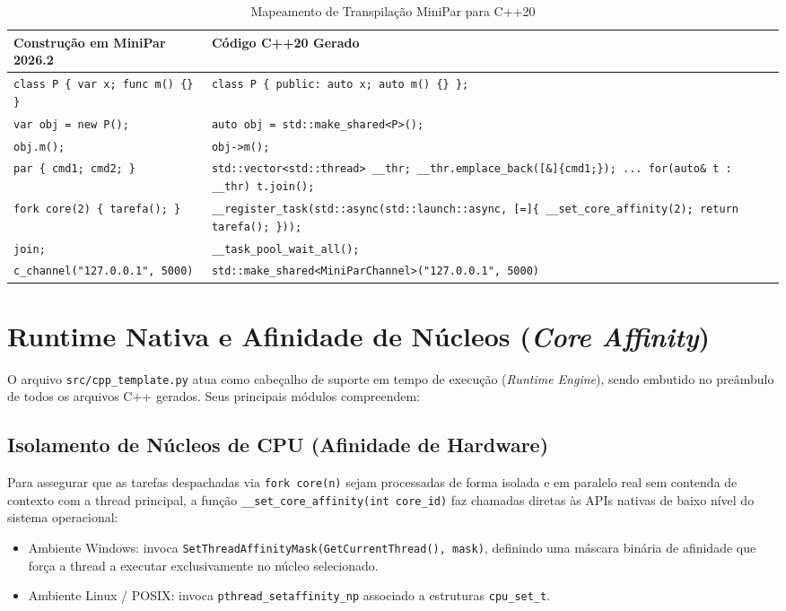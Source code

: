 \begin{table}[htbp]
\centering
\caption{Mapeamento de Transpilação MiniPar para C++20}
\label{tab:transpilacao_cpp}
\small
\begin{tabular}{p{6.5cm}p{8cm}}
\toprule
Construção em MiniPar 2026.2 & Código C++20 Gerado \\
\midrule
\texttt{class P \{ var x; func m() \{\} \}} & \texttt{class P \{ public: auto x; auto m() \{\} \};} \\
\texttt{var obj = new P();} & \texttt{auto obj = std::make\_shared<P>();} \\
\texttt{obj.m();} & \texttt{obj->m();} \\
\texttt{par \{ cmd1; cmd2; \}} & \texttt{std::vector<std::thread> \_\_thr; \_\_thr.emplace\_back([\&]\{cmd1;\}); ... for(auto\& t : \_\_thr) t.join();} \\
\texttt{fork core(2) \{ tarefa(); \}} & \texttt{\_\_register\_task(std::async(std::launch::async, [=]\{ \_\_set\_core\_affinity(2); return tarefa(); \}));} \\
\texttt{join;} & \texttt{\_\_task\_pool\_wait\_all();} \\
\texttt{c\_channel("127.0.0.1", 5000)} & \texttt{std::make\_shared<MiniParChannel>("127.0.0.1", 5000)} \\
\bottomrule
\end{tabular}
\end{table}

\section{Runtime Nativa e Afinidade de Núcleos (\textit{Core Affinity})}

O arquivo \texttt{src/cpp\_template.py} atua como cabeçalho de suporte em tempo de execução (\textit{Runtime Engine}), sendo embutido no preâmbulo de todos os arquivos C++ gerados. Seus principais módulos compreendem:

\subsection{Isolamento de Núcleos de CPU (Afinidade de Hardware)}
Para assegurar que as tarefas despachadas via \texttt{fork core(n)} sejam processadas de forma isolada e em paralelo real sem contenda de contexto com a thread principal, a função \texttt{\_\_set\_core\_affinity(int core\_id)} faz chamadas diretas às APIs nativas de baixo nível do sistema operacional:
\begin{itemize}
    \item Ambiente Windows: invoca \texttt{SetThreadAffinityMask(GetCurrentThread(), mask)}, definindo uma máscara binária de afinidade que força a thread a executar exclusivamente no núcleo selecionado.
    \item Ambiente Linux / POSIX: invoca \texttt{pthread\_setaffinity\_np} associado a estruturas \texttt{cpu\_set\_t}.
\end{itemize}

